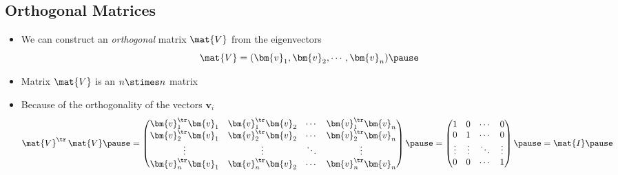 \begin{slide}
\section[-2]{Orthogonal Matrices}

\begin{PauseHighLight}
  \begin{itemize}
  \item We can construct an \emph{orthogonal} matrix $\mat{V}$ from the
    eigenvectors
    \begin{displaymath}
      \mat{V} = (\bm{v}_1, \bm{v}_2 , \cdots, \bm{v}_n)\pause
    \end{displaymath}
    \vspace*{-1cm}
  \item Matrix $\mat{V}$ is an $n\stimes n$ matrix\pause
  \item Because of the orthogonality of the vectors $\bm{v}_i$
    \begin{displaymath}
      \mat{V}^\tr \, \mat{V} \pause =
      \begin{pmatrix}
        \bm{v}^\tr_1 \bm{v}_1 & \bm{v}^\tr_1 \bm{v}_2 & \cdots &
        \bm{v}^\tr_1 \bm{v}_n
        \\
        \bm{v}^\tr_2 \bm{v}_1 & \bm{v}^\tr_2 \bm{v}_2 & \cdots &
        \bm{v}^\tr_2 \bm{v}_n
        \\
        \vdots & \vdots & \ddots & \vdots
        \\
        \bm{v}^\tr_n \bm{v}_1 & \bm{v}^\tr_n \bm{v}_2 & \cdots &
        \bm{v}^\tr_n \bm{v}_n
      \end{pmatrix} \pause =
      \begin{pmatrix}
        1 & 0 & \cdots & 0 \\
        0 & 1 & \cdots & 0 \\
        \vdots & \vdots & \ddots & \vdots \\
        0 & 0 & \cdots & 1
      \end{pmatrix} \pause
      = \mat{I}\pause
    \end{displaymath}
  \end{itemize}
\end{PauseHighLight}

\end{slide}


